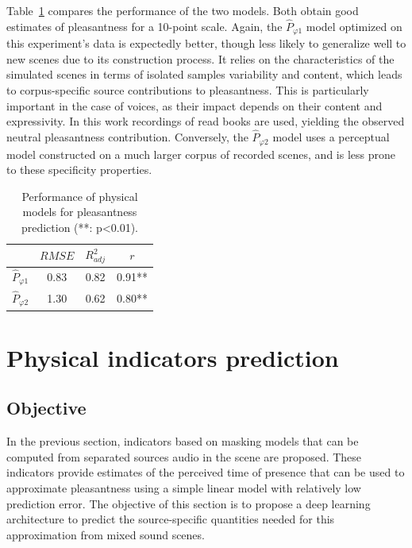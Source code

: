 \documentclass[11pt,a4paper]{article}
\begin{document}
Table~\ref{tab:physm} compares the performance of the two models. Both obtain good estimates of pleasantness for a 10-point scale. Again, the $\hat P_{\varphi 1}$ model optimized on this experiment's data is expectedly better, though less likely to generalize well to new scenes due to its construction process. It relies on the characteristics of the simulated scenes in terms of isolated samples variability and content, which leads to corpus-specific source contributions to pleasantness. This is particularly important in the case of voices, as their impact depends on their content and expressivity. In this work recordings of read books are used, yielding the observed neutral pleasantness contribution. Conversely, the $\hat P_{\varphi 2}$ model uses a perceptual model constructed on a much larger corpus of recorded scenes, and is less prone to these specificity properties.

\begin{table}[t]
\centering
\caption{Performance of physical models for pleasantness prediction (**: p<0.01).}
\label{tab:physm}
\begin{tabular}{ c | c | c | c }
\hline
	 & $RMSE$ & $R^2_{adj}$ & $r$ \\ \hline
	$\hat P_{\varphi 1}$ & 0.83 & 0.82 & 0.91** \\
	$\hat P_{\varphi 2}$ & 1.30 & 0.62 & 0.80** \\ \hline
\end{tabular}
\end{table}



\section{Physical indicators prediction}
\label{sec:pred}

\subsection{Objective}
\label{sec:pred_obj}

In the previous section,  indicators based on masking models that can be computed from separated sources audio in the scene are proposed. These indicators provide estimates of the perceived time of presence that can be used to approximate pleasantness using a simple linear model with relatively low prediction error. The objective of this section is to propose a deep learning architecture to predict the source-specific quantities needed for this approximation from mixed sound scenes.
\end{document}
